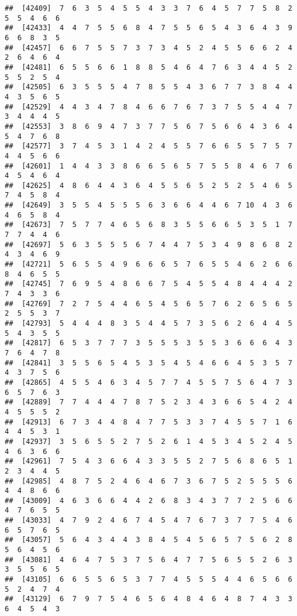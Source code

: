 \documentclass[
]{book}
\begin{document}
\begin{verbatim}
##  [42409]  7  6  3  5  4  5  5  4  3  3  7  6  4  5  7  7  5  8  2  5  5  4  6  6
##  [42433]  4  4  7  5  5  6  8  4  7  5  5  6  5  4  3  6  4  3  9  6  6  8  3  5
##  [42457]  6  6  7  5  5  7  3  7  3  4  5  2  4  5  5  6  6  2  4  2  6  4  6  4
##  [42481]  6  5  5  6  6  1  8  8  5  4  6  4  7  6  3  4  4  5  2  5  5  2  5  4
##  [42505]  6  3  5  5  5  4  7  8  5  5  4  3  6  7  7  3  8  4  4  4  3  5  6  5
##  [42529]  4  4  3  4  7  8  4  6  6  7  6  7  3  7  5  5  4  4  7  3  4  4  4  5
##  [42553]  3  8  6  9  4  7  3  7  7  5  6  7  5  6  6  4  3  6  4  5  4  7  6  8
##  [42577]  3  7  4  5  3  1  4  2  4  5  5  7  6  6  5  5  7  5  7  4  4  5  6  6
##  [42601]  1  4  4  3  3  8  6  6  5  6  5  7  5  5  8  4  6  7  6  4  5  4  6  4
##  [42625]  4  8  6  4  4  3  6  4  5  5  6  5  2  5  2  5  4  6  5  7  4  5  8  4
##  [42649]  3  5  5  4  5  5  5  6  3  6  6  4  4  6  7 10  4  3  6  4  6  5  8  4
##  [42673]  7  5  7  7  4  6  5  6  8  3  5  5  6  6  5  3  5  1  7  7  7  4  4  6
##  [42697]  5  6  3  5  5  5  6  7  4  4  7  5  3  4  9  8  6  8  2  4  3  4  6  9
##  [42721]  5  6  5  5  4  9  6  6  6  5  7  6  5  5  4  6  2  6  6  8  4  6  5  5
##  [42745]  7  6  9  5  4  8  6  6  7  5  4  5  5  4  8  4  4  4  2  7  4  3  3  6
##  [42769]  7  2  7  5  4  4  6  5  4  5  6  5  7  6  2  6  5  6  5  2  5  5  3  7
##  [42793]  5  4  4  4  8  3  5  4  4  5  7  3  5  6  2  6  4  4  5  5  4  3  5  5
##  [42817]  6  5  3  7  7  7  3  5  5  5  3  5  5  3  6  6  6  4  3  7  6  4  7  8
##  [42841]  3  5  5  6  5  4  5  3  5  4  5  4  6  6  4  5  3  5  7  4  3  7  5  6
##  [42865]  4  5  5  4  6  3  4  5  7  7  4  5  5  7  5  6  4  7  3  6  5  7  6  3
##  [42889]  7  7  4  4  4  7  8  7  5  2  3  4  3  6  6  5  4  2  4  4  5  5  5  2
##  [42913]  6  7  3  4  4  8  4  7  7  5  3  3  7  4  5  5  7  1  6  4  4  5  3  1
##  [42937]  3  5  6  5  5  2  7  5  2  6  1  4  5  3  4  5  2  4  5  4  6  3  6  6
##  [42961]  7  5  4  3  6  6  4  3  3  5  5  2  7  5  6  8  6  5  1  2  3  4  4  5
##  [42985]  4  8  7  5  2  4  6  4  6  7  3  6  7  5  2  5  5  5  6  4  4  8  6  6
##  [43009]  4  6  3  6  6  4  4  2  6  8  3  4  3  7  7  2  5  6  6  4  7  6  5  5
##  [43033]  4  7  9  2  4  6  7  4  5  4  7  6  7  3  7  7  5  4  6  6  5  7  6  5
##  [43057]  5  6  4  3  4  4  3  8  4  5  4  5  6  5  7  5  6  2  8  5  6  4  5  6
##  [43081]  4  6  4  7  5  3  7  5  6  4  7  7  5  6  5  5  2  6  3  3  5  5  6  5
##  [43105]  6  6  5  5  6  5  3  7  7  4  5  5  5  4  4  6  5  6  6  5  2  4  7  4
##  [43129]  6  7  9  7  5  4  6  5  6  4  8  4  6  4  8  7  4  3  3  6  4  5  4  3

\end{verbatim}
\end{document}

